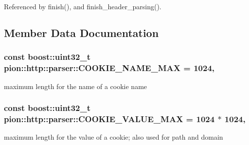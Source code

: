 Referenced by finish(), and finish\-\_\-header\-\_\-parsing().



\subsection{Member Data Documentation}
\hypertarget{classpion_1_1http_1_1parser_a12cb4b88d7debd8467cc9de786721be2}{
\subsubsection[{C\-O\-O\-K\-I\-E\-\_\-\-N\-A\-M\-E\-\_\-\-M\-A\-X}]{\setlength{\rightskip}{0pt plus 5cm}const boost\-::uint32\-\_\-t pion\-::http\-::parser\-::\-C\-O\-O\-K\-I\-E\-\_\-\-N\-A\-M\-E\-\_\-\-M\-A\-X = 1024\hspace{0.3cm}{\ttfamily [static]}, {\ttfamily [protected]}}}\label{classpion_1_1http_1_1parser_a12cb4b88d7debd8467cc9de786721be2}


maximum length for the name of a cookie name 

\hypertarget{classpion_1_1http_1_1parser_a50ae5c379ee3ad611fa6874bfcd8ed83}{
\subsubsection[{C\-O\-O\-K\-I\-E\-\_\-\-V\-A\-L\-U\-E\-\_\-\-M\-A\-X}]{\setlength{\rightskip}{0pt plus 5cm}const boost\-::uint32\-\_\-t pion\-::http\-::parser\-::\-C\-O\-O\-K\-I\-E\-\_\-\-V\-A\-L\-U\-E\-\_\-\-M\-A\-X = 1024 $\ast$ 1024\hspace{0.3cm}{\ttfamily [static]}, {\ttfamily [protected]}}}\label{classpion_1_1http_1_1parser_a50ae5c379ee3ad611fa6874bfcd8ed83}


maximum length for the value of a cookie; also used for path and domain 

